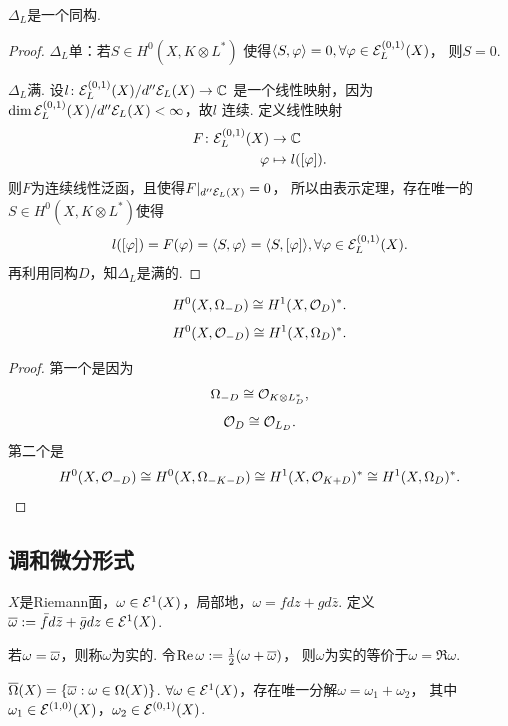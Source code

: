 \begin{theorem}[Serre]
	$\Delta_L$是一个同构.
\end{theorem}

\begin{proof}
	$\Delta_L$单：若$S\in  H^0(X, K\otimes L^*)$
    使得$\langle S,\varphi\rangle =0, \forall \varphi\in \mathcal{E}^{(0,1)}_L(X)$，
    则$S=0$.

	$\Delta_L$满. 设$l\colon \mathcal{E}^{(0,1)}_L(X)/d'' \mathcal{E}_L(X) \rightarrow \mathbb{C}$
    是一个线性映射，因为$\dim \mathcal{E}^{(0,1)}_L(X)/d'' \mathcal{E}_L(X)<\infty$，故$l$ 连续. 
    定义线性映射
	\begin{align*}
		F\colon\mathcal{E}^{(0,1)}_L(X) &\rightarrow \mathbb{C}\\
		\varphi &\mapsto l([\varphi]).
	\end{align*}
	则$F$为连续线性泛函，且使得$F|_{d''\mathcal{E}_L(X)}=0$，
    所以由表示定理，存在唯一的$S\in H^0(X, K\otimes L^*)$使得
	$$l([\varphi])=F(\varphi)=\langle S, \varphi \rangle 
    =\langle S, [\varphi] \rangle, \forall \varphi \in \mathcal{E}^{(0,1)}_L(X).$$
	再利用同构$D$，知$\Delta_L$是满的.
\end{proof}

\begin{corollary}[Serre对偶定理]
	$$H^0(X,\Omega_{-D})\cong H^1(X, \mathcal{O}_D)^*.$$
	$$H^0(X, \mathcal{O}_{-D})\cong H^1(X, \Omega_D)^*.$$
\end{corollary}

\begin{proof}
    第一个是因为
	$$\Omega_{-D}\cong \mathcal{O}_{K\otimes L_D^*},$$
	$$\mathcal{O}_D \cong \mathcal{O}_{L_D}.$$
	第二个是
	$$H^0(X, \mathcal{O}_{-D})\cong H^0(X, \Omega_{-K-D}) 
    \cong H^1(X, \mathcal{O}_{K+D})^* \cong H^1(X, \Omega_D)^*.\qedhere$$
\end{proof}


\subsection{调和微分形式}

\begin{definition}
	$X$是Riemann面，$\omega\in \mathcal{E}^1(X)$，局部地，$\omega=fdz+gd\bar{z}$. 
    定义$\overline{\omega}:=\bar{f}d\bar{z}+\bar{g}dz\in \mathcal{E}^1(X)$.

	若$\omega=\overline{\omega}$，则称$\omega$为实的. 
    令$\operatorname{Re} \omega:=\frac{1}{2}(\omega+\overline{\omega})$，
    则$\omega$为实的等价于$\omega=\Re \omega$.

	$\overline{\Omega}(X)=\{\overline{\omega}:\omega\in \Omega(X)\}$. 
    $\forall \omega\in \mathcal{E}^1(X)$，存在唯一分解$\omega=\omega_1+\omega_2$，
    其中$\omega_1\in \mathcal{E}^{(1,0)}(X)$，$\omega_2\in \mathcal{E}^{(0,1)}(X)$.
\end{definition}

